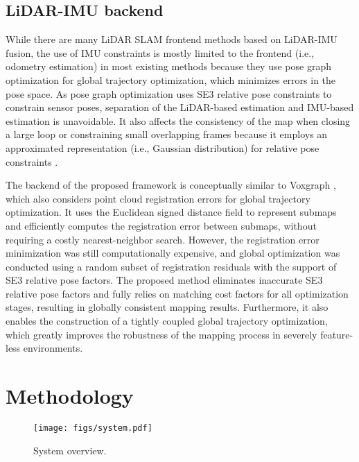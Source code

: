 \documentclass[letterpaper, 10 pt, conference]{ieeeconf}  %
\begin{document}
\subsection{LiDAR-IMU backend}

While there are many LiDAR SLAM frontend methods based on LiDAR-IMU fusion, the use of IMU constraints is mostly limited to the frontend (i.e., odometry estimation) in most existing methods \cite{liosam2020shan,Li2021,Shan2018} because they use pose graph optimization for global trajectory optimization, which minimizes errors in the pose space. As pose graph optimization uses SE3 relative pose constraints to constrain sensor poses, separation of the LiDAR-based estimation and IMU-based estimation is unavoidable. It also affects the consistency of the map when closing a large loop or constraining small overlapping frames because it employs an approximated representation (i.e., Gaussian distribution) for relative pose constraints \cite{koide_ral2021}.

The backend of the proposed framework is conceptually similar to Voxgraph \cite{Reijgwart2020}, which also considers point cloud registration errors for global trajectory optimization. It uses the Euclidean signed distance field \cite{Oleynikova2017} to represent submaps and efficiently computes the registration error between submaps, without requiring a costly nearest-neighbor search. However, the registration error minimization was still computationally expensive, and global optimization was conducted using a random subset of registration residuals with the support of SE3 relative pose factors. The proposed method eliminates inaccurate SE3 relative pose factors and fully relies on matching cost factors for all optimization stages, resulting in globally consistent mapping results. Furthermore, it also enables the construction of a tightly coupled global trajectory optimization, which greatly improves the robustness of the mapping process in severely feature-less environments.


\section{Methodology}

\begin{figure}[tb]
  \centering
  \texttt{[image: figs/system.pdf]}
  \caption{System overview.}
  \label{fig:system}
\end{figure}
\end{document}
